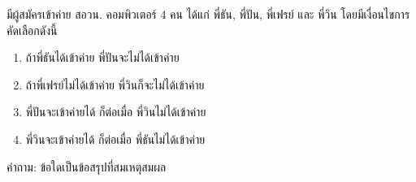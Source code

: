 ﻿%
\question มีผู้สมัครเข้าค่าย สอวน. คอมพิวเตอร์ 4 คน ได้แก่ พี่ธัน, พี่ปัน, พี่เฟรย์ และ พี่วิน โดยมีเงื่อนไขการคัดเลือกดังนี้
\begin{enumerate}
    \item ถ้าพี่ธันได้เข้าค่าย พี่ปันจะไม่ได้เข้าค่าย
    \item ถ้าพี่เฟรย์ไม่ได้เข้าค่าย พี่วินก็จะไม่ได้เข้าค่าย
    \item พี่ปันจะเข้าค่ายได้ ก็ต่อเมื่อ พี่วินไม่ได้เข้าค่าย
    \item พี่วินจะเข้าค่ายได้ ก็ต่อเมื่อ พี่ธันไม่ได้เข้าค่าย
\end{enumerate}
คำถาม: ข้อใดเป็นข้อสรุปที่สมเหตุสมผล
\newline
{}

